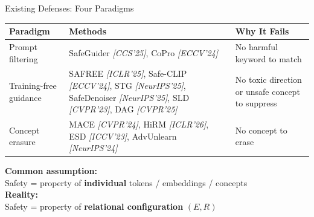 \documentclass[aspectratio=169,12pt]{beamer}
\begin{document}
\begin{frame}{Existing Defenses: Four Paradigms}

\renewcommand{\arraystretch}{1.3}
\scriptsize
\begin{tabular}{@{} l >{\raggedright\arraybackslash}p{5.2cm} >{\raggedright\arraybackslash}p{3.5cm} @{}}
\toprule
\textbf{Paradigm} & \textbf{Methods} & \textbf{Why It Fails} \\
\midrule
Prompt filtering & SafeGuider \textit{[CCS'25]}, CoPro \textit{[ECCV'24]} & No harmful keyword to match \\[2pt]
Training-free guidance & SAFREE \textit{[ICLR'25]}, Safe-CLIP \textit{[ECCV'24]}, STG \textit{[NeurIPS'25]}, SafeDenoiser \textit{[NeurIPS'25]}, SLD \textit{[CVPR'23]}, DAG \textit{[CVPR'25]} & No toxic direction or unsafe concept to suppress \\[2pt]
Concept erasure & MACE \textit{[CVPR'24]}, HiRM \textit{[ICLR'26]}, ESD \textit{[ICCV'23]}, AdvUnlearn \textit{[NeurIPS'24]} & No concept to erase \\
\bottomrule
\end{tabular}

\vspace{12pt}

\begin{center}
\textcolor{dangerred}{\textbf{Common assumption:}}\\
Safety = property of \textbf{individual} tokens / embeddings / concepts\\[8pt]
\textcolor{accentblue}{\textbf{Reality:}}\\
Safety = property of \textbf{relational configuration} $(E, R)$
\end{center}

\end{frame}
\end{document}
